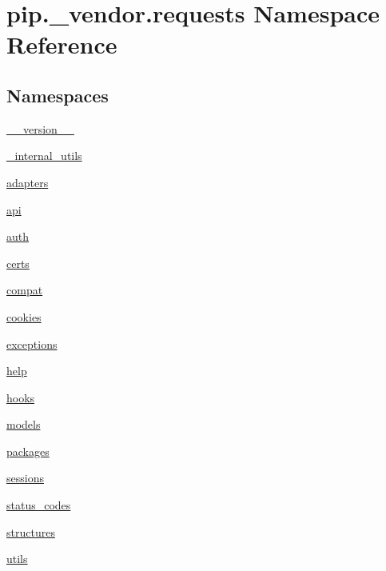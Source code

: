 \hypertarget{namespacepip_1_1__vendor_1_1requests}{}\section{pip.\+\_\+vendor.\+requests Namespace Reference}
\label{namespacepip_1_1__vendor_1_1requests}
\subsection*{Namespaces}
\begin{DoxyCompactItemize}
\item 
 \hyperlink{namespacepip_1_1__vendor_1_1requests_1_1____version____}{\+\_\+\+\_\+version\+\_\+\+\_\+}
\item 
 \hyperlink{namespacepip_1_1__vendor_1_1requests_1_1__internal__utils}{\+\_\+internal\+\_\+utils}
\item 
 \hyperlink{namespacepip_1_1__vendor_1_1requests_1_1adapters}{adapters}
\item 
 \hyperlink{namespacepip_1_1__vendor_1_1requests_1_1api}{api}
\item 
 \hyperlink{namespacepip_1_1__vendor_1_1requests_1_1auth}{auth}
\item 
 \hyperlink{namespacepip_1_1__vendor_1_1requests_1_1certs}{certs}
\item 
 \hyperlink{namespacepip_1_1__vendor_1_1requests_1_1compat}{compat}
\item 
 \hyperlink{namespacepip_1_1__vendor_1_1requests_1_1cookies}{cookies}
\item 
 \hyperlink{namespacepip_1_1__vendor_1_1requests_1_1exceptions}{exceptions}
\item 
 \hyperlink{namespacepip_1_1__vendor_1_1requests_1_1help}{help}
\item 
 \hyperlink{namespacepip_1_1__vendor_1_1requests_1_1hooks}{hooks}
\item 
 \hyperlink{namespacepip_1_1__vendor_1_1requests_1_1models}{models}
\item 
 \hyperlink{namespacepip_1_1__vendor_1_1requests_1_1packages}{packages}
\item 
 \hyperlink{namespacepip_1_1__vendor_1_1requests_1_1sessions}{sessions}
\item 
 \hyperlink{namespacepip_1_1__vendor_1_1requests_1_1status__codes}{status\+\_\+codes}
\item 
 \hyperlink{namespacepip_1_1__vendor_1_1requests_1_1structures}{structures}
\item 
 \hyperlink{namespacepip_1_1__vendor_1_1requests_1_1utils}{utils}
\end{DoxyCompactItemize}
